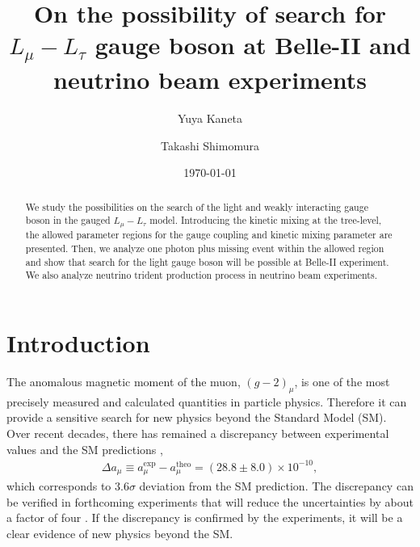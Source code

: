 \documentclass[preprint,amsmath,amssymb,superscriptaddress,nofootinbib]{revtex4}
\begin{document}
\title{On the possibility of  search for $L_\mu - L_\tau$ gauge boson at Belle-II and neutrino beam experiments}

\author{Yuya Kaneta}

\author{Takashi Shimomura}


\begin{abstract}
We study the possibilities on the search of the light and weakly interacting gauge boson in the gauged $L_\mu - L_\tau$ model. 
Introducing the kinetic mixing at the tree-level, the allowed parameter regions for the gauge coupling and kinetic mixing parameter 
are presented. Then, we analyze one photon plus missing event within the allowed region and show that search for the light 
gauge boson will be possible at Belle-II experiment. We also analyze neutrino trident production process in neutrino beam experiments.
\end{abstract}

\date{\today}

\maketitle


\section{Introduction}
The anomalous magnetic moment of the muon, $(g-2)_\mu$, is one of the most precisely measured and calculated quantities 
in particle physics. Therefore it can provide a sensitive search for new physics beyond the Standard Model (SM).
Over recent decades,  there has remained a discrepancy between experimental values 
\cite{Bennett:2006fi, Olive:2016xmw} and 
the SM predictions
\cite{Davier:2010nc,Jegerlehner:2011ti,Hagiwara:2011af,Aoyama:2012wk}, 
\begin{align}
\Delta a_\mu \equiv a_\mu^{\mathrm{exp}} - a_\mu^{\mathrm{theo}}= (28.8 \pm 8.0) \times 10^{-10}, \label{eq:mu-g-2}
\end{align} 
which corresponds to $3.6\sigma$ deviation from the SM prediction. 
The discrepancy can be verified in forthcoming   
experiments that will reduce the uncertainties by about a factor of four \cite{Aoki-j-park, Grange:2015fou}. 
If the discrepancy is confirmed 
by the experiments, it will be a clear evidence of new physics beyond the SM. 
\end{document}
